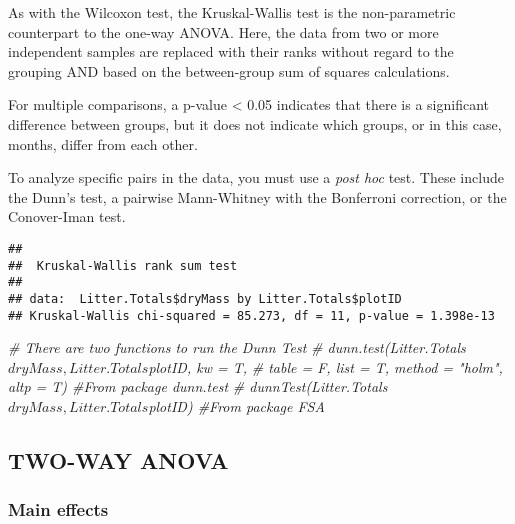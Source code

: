 \documentclass[
]{article}
\newenvironment{Shaded}{\begin{snugshade}}{\end{snugshade}}
\newcommand{\CommentTok}[1]{\textcolor[rgb]{0.56,0.35,0.01}{\textit{#1}}}
\newcommand{\KeywordTok}[1]{\textcolor[rgb]{0.13,0.29,0.53}{\textbf{#1}}}
\newcommand{\NormalTok}[1]{#1}
\newcommand{\OperatorTok}[1]{\textcolor[rgb]{0.81,0.36,0.00}{\textbf{#1}}}
\newcommand{\StringTok}[1]{\textcolor[rgb]{0.31,0.60,0.02}{#1}}
\begin{document}
As with the Wilcoxon test, the Kruskal-Wallis test is the non-parametric
counterpart to the one-way ANOVA. Here, the data from two or more
independent samples are replaced with their ranks without regard to the
grouping AND based on the between-group sum of squares calculations.

For multiple comparisons, a p-value \textless{} 0.05 indicates that
there is a significant difference between groups, but it does not
indicate which groups, or in this case, months, differ from each other.

To analyze specific pairs in the data, you must use a \emph{post hoc}
test. These include the Dunn's test, a pairwise Mann-Whitney with the
Bonferroni correction, or the Conover-Iman test.

\begin{Shaded}
\end{Shaded}

\begin{verbatim}
## 
##  Kruskal-Wallis rank sum test
## 
## data:  Litter.Totals$dryMass by Litter.Totals$plotID
## Kruskal-Wallis chi-squared = 85.273, df = 11, p-value = 1.398e-13
\end{verbatim}

\begin{Shaded}
\begin{Highlighting}[]
\CommentTok{# There are two functions to run the Dunn Test}
\CommentTok{# dunn.test(Litter.Totals$dryMass, Litter.Totals$plotID, kw = T, }
\CommentTok{#           table = F, list = T, method = "holm", altp = T)   #From package dunn.test}
\CommentTok{# dunnTest(Litter.Totals$dryMass, Litter.Totals$plotID)                    #From package FSA}
\end{Highlighting}
\end{Shaded}

\hypertarget{two-way-anova}{%
\subsection{TWO-WAY ANOVA}\label{two-way-anova}}

\hypertarget{main-effects}{%
\subsubsection{Main effects}\label{main-effects}}
\end{document}
